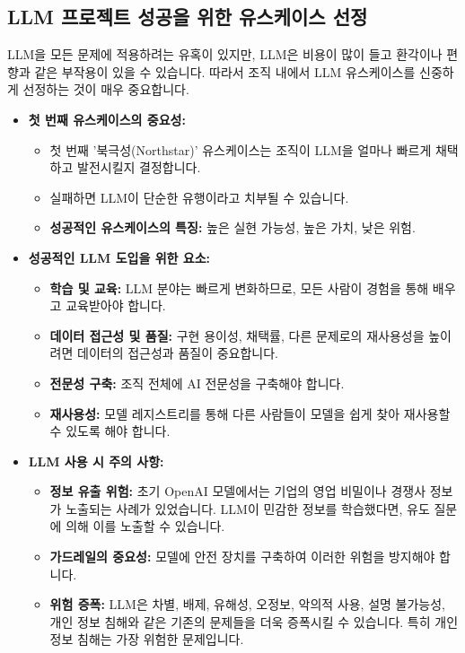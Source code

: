 \documentclass[11pt,a4paper]{article}
\begin{document}
\subsection{LLM 프로젝트 성공을 위한 유스케이스 선정}

LLM을 모든 문제에 적용하려는 유혹이 있지만, LLM은 비용이 많이 들고 환각이나 편향과 같은 부작용이 있을 수 있습니다. 따라서 조직 내에서 LLM 유스케이스를 신중하게 선정하는 것이 매우 중요합니다.

\begin{itemize}
    \item \textbf{첫 번째 유스케이스의 중요성:}
    \begin{itemize}
        \item 첫 번째 '북극성(Northstar)' 유스케이스는 조직이 LLM을 얼마나 빠르게 채택하고 발전시킬지 결정합니다.
        \item 실패하면 LLM이 단순한 유행이라고 치부될 수 있습니다.
        \item \textbf{성공적인 유스케이스의 특징:} 높은 실현 가능성, 높은 가치, 낮은 위험.
    \end{itemize}

    \item \textbf{성공적인 LLM 도입을 위한 요소:}
    \begin{itemize}
        \item \textbf{학습 및 교육:} LLM 분야는 빠르게 변화하므로, 모든 사람이 경험을 통해 배우고 교육받아야 합니다.
        \item \textbf{데이터 접근성 및 품질:} 구현 용이성, 채택률, 다른 문제로의 재사용성을 높이려면 데이터의 접근성과 품질이 중요합니다.
        \item \textbf{전문성 구축:} 조직 전체에 AI 전문성을 구축해야 합니다.
        \item \textbf{재사용성:} 모델 레지스트리를 통해 다른 사람들이 모델을 쉽게 찾아 재사용할 수 있도록 해야 합니다.
    \end{itemize}

    \item \textbf{LLM 사용 시 주의 사항:}
    \begin{itemize}
        \item \textbf{정보 유출 위험:} 초기 OpenAI 모델에서는 기업의 영업 비밀이나 경쟁사 정보가 노출되는 사례가 있었습니다. LLM이 민감한 정보를 학습했다면, 유도 질문에 의해 이를 노출할 수 있습니다.
        \item \textbf{가드레일의 중요성:} 모델에 안전 장치를 구축하여 이러한 위험을 방지해야 합니다.
        \item \textbf{위험 증폭:} LLM은 차별, 배제, 유해성, 오정보, 악의적 사용, 설명 불가능성, 개인 정보 침해와 같은 기존의 문제들을 더욱 증폭시킬 수 있습니다. 특히 개인 정보 침해는 가장 위험한 문제입니다.
    \end{itemize}
\end{itemize}
\end{document}
